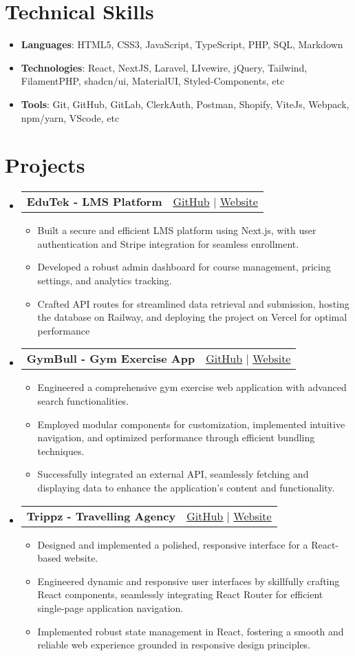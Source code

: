 \documentclass[letterpaper, 11pt]{article}
\makeatletter
\newcommand{\resumeItem}[1]{ \item\small{ {#1 \vspace{-2pt}} } }
\newcommand{\resumeProjectHeading}[2]{ \item
\begin{tabular*}{0.97\textwidth}{l@{\extracolsep{\fill}}r}
	\small#1 & #2 \\
\end{tabular*}
\vspace{-7pt}
}
\newcommand{\resumeSubHeadingListStart}{\begin{itemize}[leftmargin=0.15in, label={}]}
\newcommand{\resumeSubHeadingListEnd}{\end{itemize}}
\newcommand{\resumeItemListStart}{\begin{itemize}}
\newcommand{\resumeItemListEnd}{\end{itemize}
\vspace{-5pt}}
\makeatother
\begin{document}
	\section{Technical Skills}
	\resumeItemListStart \resumeItem{\textbf{Languages}{: HTML5, CSS3, JavaScript, TypeScript, PHP, SQL, Markdown}}
	\resumeItem{\textbf{Technologies}{: React, NextJS, Laravel, LIvewire, jQuery, Tailwind, FilamentPHP, shadcn/ui, MaterialUI, Styled-Components, etc}}
	\resumeItem{\textbf{Tools}{: Git, GitHub, GitLab, ClerkAuth, Postman, Shopify, ViteJs, Webpack, npm/yarn, VScode, etc}}
	\resumeItemListEnd

	\section{Projects}
	\resumeSubHeadingListStart \resumeProjectHeading
	{\textbf{EduTek - LMS Platform}}
	{{ {\small {\faGithub} \href{https://github.com/dushmanta05/edutek}{\underline{GitHub}}} $|$ {\small {\faGlobe} \href{https://edutek.vercel.app/}{{\underline{Website}}}}}}
	\resumeItemListStart \resumeItem{Built a secure and efficient LMS platform using Next.js, with user authentication and Stripe integration for seamless enrollment.}
	\resumeItem{Developed a robust admin dashboard for course management, pricing settings, and analytics tracking.}
	\resumeItem{Crafted API routes for streamlined data retrieval and submission, hosting the database on Railway, and deploying the project on Vercel for optimal performance}
	\resumeItemListEnd \resumeProjectHeading {\textbf{GymBull - Gym Exercise App}}
	{{ {\small {\faGithub} \href{https://github.com/dushmanta05/gymbull}{\underline{GitHub}}} $|$ {\small {\faGlobe} \href{https://fit-bull.netlify.app/}{{\underline{Website}}}}}}
	\resumeItemListStart \resumeItem{Engineered a comprehensive gym exercise web application with advanced search functionalities.}
	\resumeItem{Employed modular components for customization, implemented intuitive navigation, and optimized performance through efficient bundling techniques.}
	\resumeItem{Successfully integrated an external API, seamlessly fetching and displaying data to enhance the application's content and functionality.}
	\resumeItemListEnd \resumeProjectHeading {\textbf{Trippz - Travelling Agency}}
	{{ {\small {\faGithub} \href{https://github.com/dushmanta05/trippz}{\underline{GitHub}}} $|$ {\small {\faGlobe} \href{https://trippz.vercel.app/}{{\underline{Website}}}}}}
	\resumeItemListStart \resumeItem{Designed and implemented a polished, responsive interface for a React-based website.}
	\resumeItem{Engineered dynamic and responsive user interfaces by skillfully crafting React components, seamlessly integrating React Router for efficient single-page application navigation.}
	\resumeItem{Implemented robust state management in React, fostering a smooth and reliable web experience grounded in responsive design principles.}
	\resumeItemListEnd \resumeSubHeadingListEnd
\end{document}
